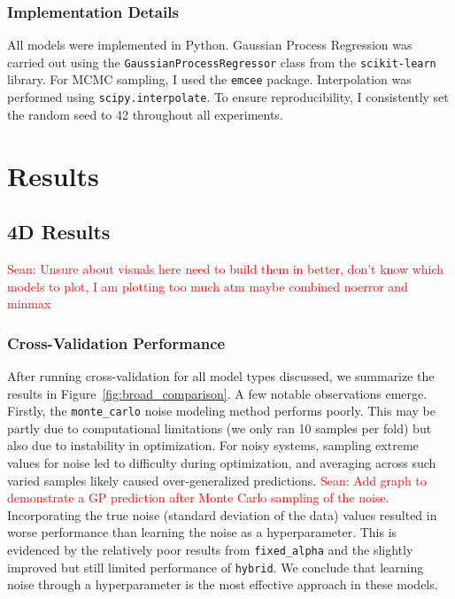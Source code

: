 \documentclass[12pt]{article}
\newcommand{\Sean}[1]{{\textcolor{red}{{Sean: #1}} }}
\begin{document}
\subsubsection*{Implementation Details}
All models were implemented in Python. Gaussian Process Regression was carried out using the \texttt{GaussianProcessRegressor} class from the \texttt{scikit-learn} library.
For MCMC sampling, I used the \texttt{emcee} package. Interpolation was performed using \texttt{scipy.interpolate}. To ensure reproducibility, I consistently set the random seed to 42 throughout all experiments.



\section{Results}
\subsection{4D Results}
\Sean{Unsure about visuals here need to build them in better, don't know which models to plot, I am plotting too much atm maybe combined noerror and minmax}

\subsubsection*{Cross-Validation Performance}

After running cross-validation for all model types discussed, we summarize the results in Figure~\ref{fig:broad_comparison}. A few notable observations emerge. Firstly, the \texttt{monte\_carlo} noise modeling method performs poorly.
This may be partly due to computational limitations (we only ran 10 samples per fold) but also due to instability in optimization. For noisy systems, sampling extreme values for noise led to difficulty during optimization, 
and averaging across such varied samples likely caused over-generalized predictions. \Sean{Add graph to demonstrate a GP prediction after Monte Carlo sampling of the noise.}
Incorporating the true noise (standard deviation of the data) values resulted in worse performance than learning the noise as a hyperparameter.
This is evidenced by the relatively poor results from \texttt{fixed\_alpha} and the slightly improved but still limited performance of \texttt{hybrid}.
We conclude that learning noise through a hyperparameter is the most effective approach in these models.
\end{document}
